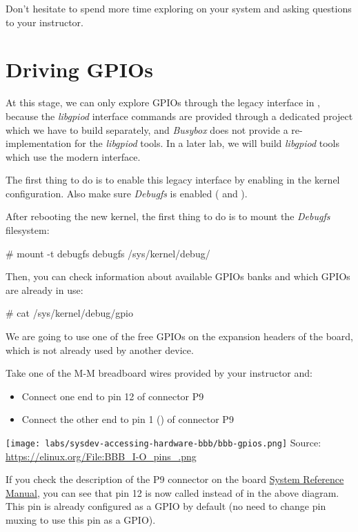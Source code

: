 Don't hesitate to spend more time exploring  on your system
and asking questions to your instructor.

\section{Driving GPIOs}

At this stage, we can only explore GPIOs through the legacy interface
in , because the {\em libgpiod} interface
commands are provided through a dedicated project which we have to
build separately, and {\em Busybox} does not provide a
re-implementation for the {\em libgpiod} tools. In a later lab, we
will build {\em libgpiod} tools which use the modern
 interface.

The first thing to do is to enable this legacy interface by enabling
 in the kernel configuration. Also make sure
{\em Debugfs} is enabled ( and
).

After rebooting the new kernel, the first thing to do is to mount
the {\em Debugfs} filesystem:

\begin{bashinput}
# mount -t debugfs debugfs /sys/kernel/debug/
\end{bashinput}

Then, you can check information about available GPIOs banks and which
GPIOs are already in use:

\begin{bashinput}
# cat /sys/kernel/debug/gpio
\end{bashinput}

We are going to use one of the free GPIOs on the expansion headers of the board,
which is not already used by another device.

Take one of the M-M breadboard wires provided by your instructor and:
\begin{itemize}
  \item Connect one end to pin 12 of connector P9
  \item Connect the other end to pin 1 () of connector P9
\end{itemize}

\texttt{[image: labs/sysdev-accessing-hardware-bbb/bbb-gpios.png]}
{\small Source: \url{https://elinux.org/File:BBB_I-O_pins_.png}}

If you check the description of the P9 connector on the board
\href{https://github.com/beagleboard/beaglebone-black/wiki/System-Reference-Manual\#712-connector-p9}{System Reference Manual},
you can see that pin 12 is now called 
instead of  in the above diagram.
This pin is already configured as a GPIO by default
(no need to change pin muxing to use this pin as a GPIO).

